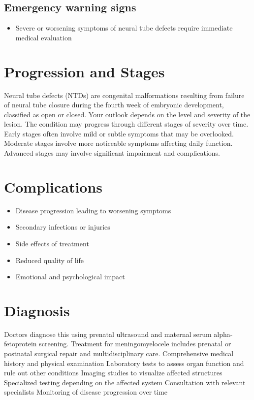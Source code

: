 \subsection{Emergency warning signs}
\begin{itemize}[noitemsep]
  \item Severe or worsening symptoms of neural tube defects require immediate medical evaluation
\end{itemize}
\section{Progression and Stages}
Neural tube defects (NTDs) are congenital malformations resulting from failure of neural tube closure during the fourth week of embryonic development, classified as open or closed. Your outlook depends on the level and severity of the lesion. The condition may progress through different stages of severity over time. Early stages often involve mild or subtle symptoms that may be overlooked. Moderate stages involve more noticeable symptoms affecting daily function. Advanced stages may involve significant impairment and complications.
\section{Complications}
\begin{itemize}[noitemsep]
  \item Disease progression leading to worsening symptoms
  \item Secondary infections or injuries
  \item Side effects of treatment
  \item Reduced quality of life
  \item Emotional and psychological impact
\end{itemize}
\section{Diagnosis}
Doctors diagnose this using prenatal ultrasound and maternal serum alpha-fetoprotein screening. Treatment for meningomyelocele includes prenatal or postnatal surgical repair and multidisciplinary care. Comprehensive medical history and physical examination Laboratory tests to assess organ function and rule out other conditions Imaging studies to visualize affected structures Specialized testing depending on the affected system Consultation with relevant specialists Monitoring of disease progression over time

